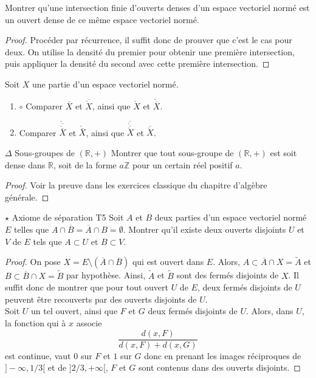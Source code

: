 \documentclass[french,a4paper]{article}
\newcommand{\Z}{\mathbb{Z}}
\newcommand{\R}{\mathbb{R}}
\theoremstyle{plain}
\theoremstyle{definition}
\theoremstyle{remark}
\begin{document}
\begin{ex}{}
	Montrer qu'une intersection finie d'ouverts denses d'un espace vectoriel normé est un ouvert dense de ce même espace vectoriel normé.
\end{ex}
\begin{proof}
	Procéder par récurrence, il suffit donc de prouver que c'est le cas pour deux. On utilise la densité du premier pour obtenir une première intersection, puis appliquer la densité du second avec cette première intersection.
\end{proof}

\begin{ex}{}
	Soit $X$ une partie d'un espace vectoriel normé.
	\begin{enumerate}
		\item $\circ$ Comparer $\overline{X}$ et $\overline{\mathring{X}}$, ainsi que $\mathring{X}$ et $\mathring{\overline{X}}$.
		\item Comparer $\mathring{\overline{\mathring{\overline{X}}}}$ et $\mathring{\overline{X}}$, ainsi que $\overline{\mathring{\overline{\mathring{X}}}}$ et $\overline{\mathring{X}}$.
	\end{enumerate}
\end{ex}

\begin{ex}{$\Delta$ Sous-groupes de $(\R,+)$}
	Montrer que tout sous-groupe de $(\R,+)$ est soit dense dans $\R$, soit de la forme $a\Z$ pour un certain réel positif $a$.
\end{ex}
\begin{proof}
	Voir la preuve dans les exercices classique du chapitre d'algèbre générale.
\end{proof}

\begin{ex}{$\star$ Axiome de séparation T5}
	Soit $A$ et $B$ deux parties d'un espace vectoriel normé $E$ telles que $A\cap\overline{B}=\overline{A}\cap B=\emptyset$. Montrer qu'il existe deux ouverts disjoints $U$ et $V$ de $E$ tels que $A\subset U$ et $B\subset V$.
\end{ex}
\begin{proof}
	On pose $X=E\setminus(\overline{A}\cap\overline{B})$ qui est ouvert dans $E$. Alors, $A\subset \overline{A}\cap X=\tilde{A}$ et $B\subset\overline{B}\cap X=\tilde{B}$ par hypothèse. Ainsi, $\tilde{A}$ et $\tilde{B}$ sont des fermés disjoints de $X$. Il suffit donc de montrer que pour tout ouvert $U$ de $E$, deux fermés disjoints de $U$ peuvent être recouverts par des ouverts disjoints de $U$. \\
	Soit $U$ un tel ouvert, ainsi que $F$ et $G$ deux fermés disjoints de $U$. Alors, dans $U$, la fonction qui à $x$ associe $$\frac{d(x,F)}{d(x,F)+d(x,G)}$$ est continue, vaut $0$ sur $F$ et $1$ sur $G$ donc en prenant les images réciproques de $]-\infty,1/3[$ et de $]2/3,+\infty[$, $F$ et $G$ sont contenus dans des ouverts disjoints.
\end{proof}
\end{document}
